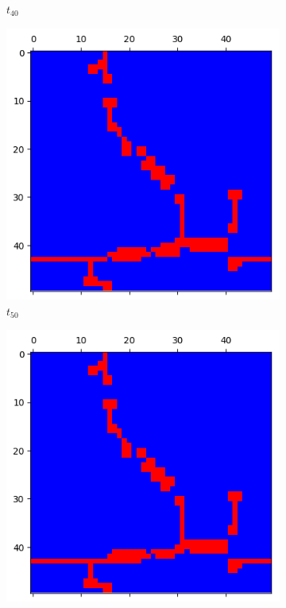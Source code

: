 \documentclass[letterpaper]{article}
\begin{document}
\begin{figure}[H]
\begin{subfigure}{.33\textwidth}
      \caption{$t_{40}$}
    \end{subfigure}
    \begin{subfigure}{.33\textwidth}
      \centering
      \includegraphics[width=1\linewidth]{images/assign2/part31-defect/t50}
      \caption{$t_{50}$}
    \end{subfigure}
    \begin{subfigure}{.33\textwidth}
      \centering
      \includegraphics[width=1\linewidth]{images/assign2/part31-defect/t60}

\end{subfigure}
\end{figure}
\end{document}
